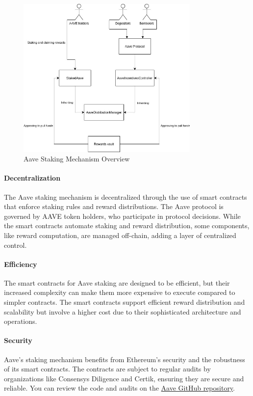 \documentclass[12pt,parskip=full, tikz]{article}
\begin{document}
\begin{figure}[h!]
\centering
\includegraphics[width=0.8\textwidth]{figures/aave-stake-architecture}
\caption{Aave Staking Mechanism Overview}
\label{fig:aave_staking_architecture}
\end{figure}

\paragraph{Decentralization}
The Aave staking mechanism is decentralized through the use of smart contracts that enforce staking rules and reward distributions. The Aave protocol is governed by AAVE token holders, who participate in protocol decisions. While the smart contracts automate staking and reward distribution, some components, like reward computation, are managed off-chain, adding a layer of centralized control.

\paragraph{Efficiency}
The smart contracts for Aave staking are designed to be efficient, but their increased complexity can make them more expensive to execute compared to simpler contracts. The smart contracts support efficient reward distribution and scalability but involve a higher cost due to their sophisticated architecture and operations.

\paragraph{Security}
Aave’s staking mechanism benefits from Ethereum’s security and the robustness of its smart contracts. The contracts are subject to regular audits by organizations like Consensys Diligence and Certik, ensuring they are secure and reliable. You can review the code and audits on the \href{https://github.com/aave/aave-stake-v2}{Aave GitHub repository}.
\end{document}
